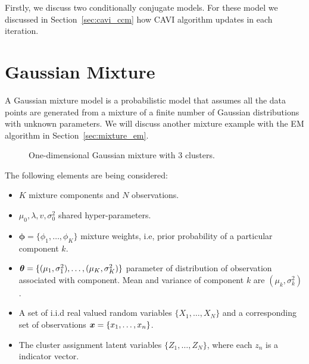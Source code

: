 
Firstly, we discuss two conditionally conjugate models. For these model we discussed in Section~\ref{sec:cavi_ccm} how CAVI algorithm updates in each iteration.

\section{Gaussian Mixture}

A Gaussian mixture model is a probabilistic model that assumes all the data points are generated from a mixture of a finite number of Gaussian distributions with unknown parameters. We will discuss another mixture example with the EM algorithm in Section~\ref{sec:mixture_em}.

\begin{figure}[h!]
  \centering
  \caption{One-dimensional Gaussian mixture with 3 clusters.}
\end{figure}


The following elements are being considered:
\begin{itemize}\setlength\itemsep{1em}
  \item \(K\) mixture components and \(N\) observations.
  \item \(\mu_{0}, \lambda, v, \sigma_{0}^{2}\) shared hyper-parameters.
  \item \(\bm{\phi} = \{\phi_{1},\dots,\phi_{K}\}\) mixture weights, i.e, prior probability of a particular component \(k\).
  \item \(\bm{\theta} = \{(\mu_{1}, \sigma^{2}_{1}),\dots,(\mu_{K},\sigma^{2}_{K})\}\) parameter of distribution of observation associated with component. Mean and variance of component \(k\) are \((\mu_{k}, \sigma_{k}^{2})\).
  \item A set of i.i.d real valued random variables \(\{X_{1},\dots, X_{N}\}\) and a corresponding set of observations \(\bm{x} = \{x_{1},\dots, x_{n}\}\).
  \item The cluster assignment latent variables \(\{Z_{1}, \dots, Z_{N}\}\), where each \(z_{n}\) is a indicator vector.
\end{itemize}

